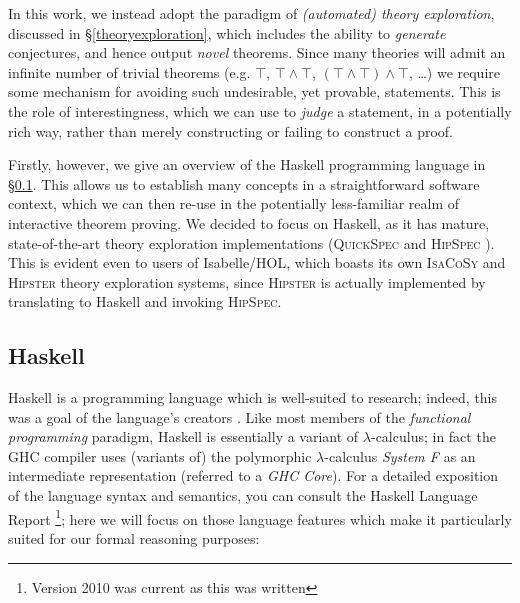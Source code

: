 \documentclass[]{article}
\begin{document}
In this work, we instead adopt the paradigm of \emph{(automated) theory exploration}, discussed in \S \ref{theoryexploration}, which includes the ability to \emph{generate} conjectures, and hence output \emph{novel} theorems. Since many theories will admit an infinite number of trivial theorems (e.g. $\top$, $\top \land \top$, $(\top \land \top) \land \top$, \dots) we require some mechanism for avoiding such undesirable, yet provable, statements. This is the role of interestingness, which we can use to \emph{judge} a statement, in a potentially rich way, rather than merely constructing or failing to construct a proof.

Firstly, however, we give an overview of the Haskell programming language in \S \ref{haskell}. This allows us to establish many concepts in a straightforward software context, which we can then re-use in the potentially less-familiar realm of interactive theorem proving. We decided to focus on Haskell, as it has mature, state-of-the-art theory exploration implementations (\textsc{QuickSpec} \cite{QuickSpec} and \textsc{HipSpec} \cite{claessen2013automating}). This is evident even to users of Isabelle/HOL, which boasts its own \textsc{IsaCoSy} \cite{johansson2009isacosy} and \textsc{Hipster} \cite{Hipster} theory exploration systems, since \textsc{Hipster} is actually implemented by translating to Haskell and invoking \textsc{HipSpec}.

\subsection{Haskell}\label{haskell}


\providecommand{\hs}[1]{\lstinline[language=Haskell]|#1|}

Haskell is a programming language which is well-suited to research; indeed, this was a goal of the language's creators \cite{marlow2010haskell}. Like most members of the \emph{functional programming} paradigm, Haskell is essentially a variant of $\lambda$-calculus; in fact the \textsc{GHC} compiler uses (variants of) the polymorphic $\lambda$-calculus \emph{System F} as an intermediate representation (referred to a \emph{GHC Core}). For a detailed exposition of the language syntax and semantics, you can consult the Haskell Language Report \cite{marlow2010haskell} \footnote{Version 2010 was current as this was written}; here we will focus on those language features which make it particularly suited for our formal reasoning purposes:
\end{document}
